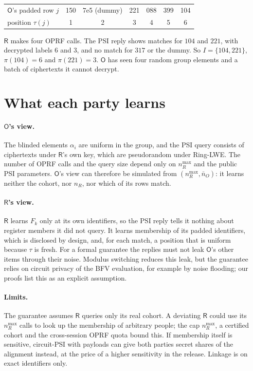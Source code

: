\documentclass[10pt]{article}
\newcommand{\Rp}{\mathsf{R}}
\newcommand{\Op}{\mathsf{O}}
\newcommand{\nR}{n_R^{\max}}
\newcommand{\nO}{\bar n_O}
\begin{document}
\begin{center}\small
\begin{tabular}{@{}lcccccc@{}}
\toprule
$\Op$'s padded row $j$ & 150 & 7e5 (dummy) & 221 & 088 & 399 & 104 \\
position $\tau(j)$ & 1 & 2 & 3 & 4 & 5 & 6 \\
\bottomrule
\end{tabular}
\end{center}
$\Rp$ makes four OPRF calls. The PSI reply shows matches for $104$ and $221$, with decrypted labels $6$ and $3$, and no match for $317$ or the dummy. So $I=\{104,221\}$, $\pi(104)=6$ and $\pi(221)=3$. $\Op$ has seen four random group elements and a batch of ciphertexts it cannot decrypt.

\section{What each party learns}

\paragraph{$\Op$'s view.} The blinded elements $\alpha_i$ are uniform in the group, and the PSI query consists of ciphertexts under $\Rp$'s own key, which are pseudorandom under Ring-LWE. The number of OPRF calls and the query size depend only on $\nR$ and the public PSI parameters. $\Op$'s view can therefore be simulated from $(\nR,\nO)$: it learns neither the cohort, nor $n_R$, nor which of its rows match.

\paragraph{$\Rp$'s view.} $\Rp$ learns $F_k$ only at its own identifiers, so the PSI reply tells it nothing about register members it did not query. It learns membership of its padded identifiers, which is disclosed by design, and, for each match, a position that is uniform because $\tau$ is fresh. For a formal guarantee the replies must not leak $\Op$'s other items through their noise. Modulus switching reduces this leak, but the guarantee relies on circuit privacy of the BFV evaluation, for example by noise flooding; our proofs list this as an explicit assumption.

\paragraph{Limits.} The guarantee assumes $\Rp$ queries only its real cohort. A deviating $\Rp$ could use its $\nR$ calls to look up the membership of arbitrary people; the cap $\nR$, a certified cohort and the cross-session OPRF quota bound this. If membership itself is sensitive, circuit-PSI with payloads \cite{rs21} can give both parties secret shares of the alignment instead, at the price of a higher sensitivity in the release. Linkage is on exact identifiers only.
\end{document}
